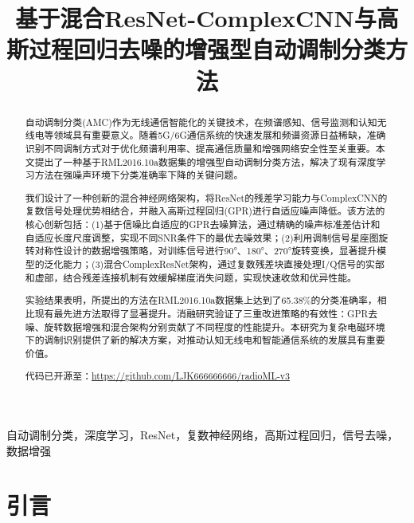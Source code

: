 \documentclass[conference]{IEEEtran}
\begin{document}
\title{基于混合ResNet-ComplexCNN与高斯过程回归去噪的增强型自动调制分类方法}

\author{
}

\maketitle

\begin{abstract}
自动调制分类(AMC)作为无线通信智能化的关键技术，在频谱感知、信号监测和认知无线电等领域具有重要意义。随着5G/6G通信系统的快速发展和频谱资源日益稀缺，准确识别不同调制方式对于优化频谱利用率、提高通信质量和增强网络安全性至关重要。本文提出了一种基于RML2016.10a数据集的增强型自动调制分类方法，解决了现有深度学习方法在强噪声环境下分类准确率下降的关键问题。

我们设计了一种创新的混合神经网络架构，将ResNet的残差学习能力与ComplexCNN的复数信号处理优势相结合，并融入高斯过程回归(GPR)进行自适应噪声降低。该方法的核心创新包括：(1)基于信噪比自适应的GPR去噪算法，通过精确的噪声标准差估计和自适应长度尺度调整，实现不同SNR条件下的最优去噪效果；(2)利用调制信号星座图旋转对称性设计的数据增强策略，对训练信号进行90°、180°、270°旋转变换，显著提升模型的泛化能力；(3)混合ComplexResNet架构，通过复数残差块直接处理I/Q信号的实部和虚部，结合残差连接机制有效缓解梯度消失问题，实现快速收敛和优异性能。

实验结果表明，所提出的方法在RML2016.10a数据集上达到了65.38\%的分类准确率，相比现有最先进方法取得了显著提升。消融研究验证了三重改进策略的有效性：GPR去噪、旋转数据增强和混合架构分别贡献了不同程度的性能提升。本研究为复杂电磁环境下的调制识别提供了新的解决方案，对推动认知无线电和智能通信系统的发展具有重要价值。

代码已开源至：\url{https://github.com/LJK666666666/radioML-v3}
\end{abstract}

\begin{IEEEkeywords}
自动调制分类，深度学习，ResNet，复数神经网络，高斯过程回归，信号去噪，数据增强
\end{IEEEkeywords}

\section{引言}
\end{document}
